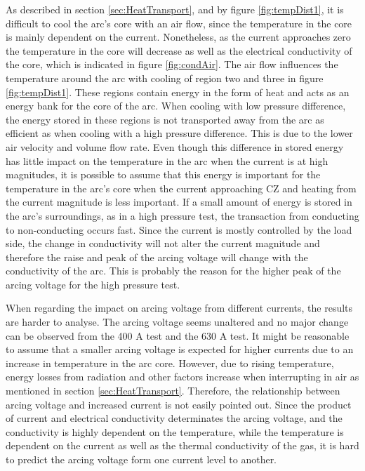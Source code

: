\documentclass[10pt,a4paper,twoside]{article}
\begin{document}
As described in section \ref{sec:HeatTransport}, and by figure \ref{fig:tempDist1}, it is difficult to cool the arc's core with an air flow, since the temperature in the core is mainly dependent on the current. Nonetheless, as the current approaches zero the temperature in the core will decrease as well as the electrical conductivity of the core, which is indicated in figure \ref{fig:condAir}. The air flow influences the temperature around the arc with cooling of region two and three in figure \ref{fig:tempDist1}. These regions contain energy in the form of heat and acts as an energy bank for the core of the arc. When cooling with low pressure difference, the energy stored in these regions is not transported away from the arc as efficient as when cooling with a high pressure difference. This is due to the lower air velocity and volume flow rate. Even though this difference in stored energy has little impact on the temperature in the arc when the current is at high magnitudes, it is possible to assume that this energy is important for the temperature in the arc's core when the current approaching CZ and heating from the current magnitude is less important. If a small amount of energy is stored in the arc's surroundings, as in a high pressure test, the transaction from conducting to non-conducting occurs fast. Since the current is mostly controlled by the load side, the change in conductivity will not alter the current magnitude and therefore the raise and peak of the arcing voltage will change with the conductivity of the arc. This is probably the reason for the higher peak of the arcing voltage for the high pressure test.

When regarding the impact on arcing voltage from different currents, the results are harder to analyse. The arcing voltage seems unaltered and no major change can be observed from the 400 A test and the 630 A test. It might be reasonable to assume that a smaller arcing voltage is expected for higher currents due to an increase in temperature in the arc core. However, due to rising temperature, energy losses from radiation and other factors increase when interrupting in air as mentioned in section \ref{sec:HeatTransport}. Therefore, the relationship between arcing voltage and increased current is not easily pointed out. Since the product of current and electrical conductivity determinates the arcing voltage, and the conductivity is highly dependent on the temperature, while the temperature is dependent on the current as well as the thermal conductivity of the gas, it is hard to predict the arcing voltage form one current level to another.
\end{document}
